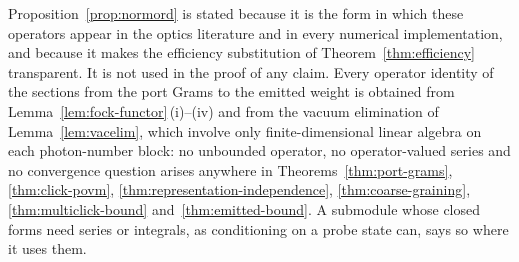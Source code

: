 
\begin{remark}
\label{rem:whyprojector}
Proposition~\ref{prop:normord} is stated because it is the form in which these
operators appear in the optics literature and in every numerical
implementation, and because it makes the efficiency substitution of
Theorem~\ref{thm:efficiency} transparent. It is not used in the proof of any claim.
Every operator identity of the sections from the port Grams to the emitted
weight is obtained from Lemma~\ref{lem:fock-functor}\,(i)--(iv) and from the
vacuum elimination of Lemma~\ref{lem:vacelim}, which involve only
finite-dimensional linear algebra on each photon-number block: no unbounded
operator, no operator-valued series and no convergence question arises
anywhere in
Theorems~\ref{thm:port-grams}, \ref{thm:click-povm}, \ref{thm:representation-independence}, \ref{thm:coarse-graining},
\ref{thm:multiclick-bound} and~\ref{thm:emitted-bound}. A submodule whose
closed forms need series or integrals, as conditioning on a probe state can,
says so where it uses them.
\end{remark}
